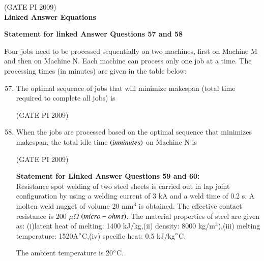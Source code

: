 \documentclass[journal,12pt,onecolumn]{IEEEtran}
\theoremstyle{remark}
\begin{document}
\hfill (GATE PI 2009) \\
\textbf{\large{Linked Answer Equations}}

\textbf{Statement for linked Answer Questions 57 and 58}

 Four jobs need to be processed sequentially on two machines, first on Machine M and then on Machine N. Each machine can process only one job at a time. The processing times (in minutes) are given in the table below:

\begin{enumerate}
\setcounter{enumi}{56}
\item The optimal sequence of jobs that will minimize makespan (total time required to complete all jobs) is 
\begin{enumerate}
\end{enumerate}
\hfill (GATE PI 2009)
\item When the jobs are processed based on the optimal sequence that minimizes makespan, the total idle time $\left(in minutes\right)$ on Machine N is
\begin{enumerate}
\end{enumerate}

\hfill (GATE PI 2009)

\textbf{Statement for Linked Answer Questions 59 and 60:} \\
Resistance spot welding of two steel sheets is carried out in lap joint configuration by using a welding current of 3 kA and a weld time of 0.2 s. A molten weld nugget of volume 20 mm$^3$ is obtained. The effective contact resistance is 200 $\mu\Omega$ $\left(micro-ohms\right)$. The material properties of steel are given as: (i)latent heat of melting: 1400 kJ/kg,(ii) density: 8000 kg/m$^3$),(iii) melting temperature: 1520A$\degree$C,(iv) specific heat: 0.5 kJ/kg$\degree$C.

The ambient temperature is 20$\degree$C. 



\end{enumerate}
\end{document}
